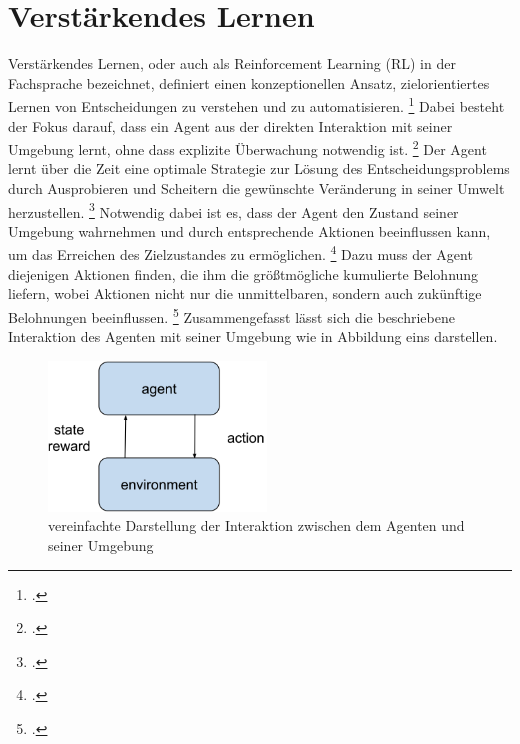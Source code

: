 \section{Verstärkendes Lernen}
Verstärkendes Lernen, oder auch als Reinforcement Learning (RL) in der Fachsprache bezeichnet, definiert einen konzeptionellen Ansatz, zielorientiertes Lernen von Entscheidungen zu verstehen und zu automatisieren. \footcite[Vgl.][S. 13]{Sutton.2018}
Dabei besteht der Fokus darauf, dass ein Agent aus der direkten Interaktion mit seiner Umgebung lernt, ohne dass explizite Überwachung notwendig ist. \footcite[Vgl.][S. 13]{Sutton.2018}
Der Agent lernt über die Zeit eine optimale Strategie zur Lösung des Entscheidungsproblems durch Ausprobieren und Scheitern die gewünschte Veränderung in seiner Umwelt herzustellen. \footcite[Vgl.][S. 4]{Li.2019}
Notwendig dabei ist es, dass der Agent den Zustand seiner Umgebung wahrnehmen und durch entsprechende Aktionen beeinflussen kann, um das Erreichen des Zielzustandes zu ermöglichen. \footcite[Vgl.][S. 2]{Sutton.2018}
Dazu muss der Agent diejenigen Aktionen finden, die ihm die größtmögliche kumulierte Belohnung liefern, wobei Aktionen nicht nur die unmittelbaren, sondern auch zukünftige Belohnungen beeinflussen. \footcite[Vgl.][S. 1]{Sutton.2018}
Zusammengefasst lässt sich die beschriebene Interaktion des Agenten mit seiner Umgebung wie in Abbildung eins darstellen.
\begin{figure}[htb]
    \centering
    \includegraphics[height=4cm]{lib/graphics/Agent-Environment interaction.png}
    \caption[vereinfachte Darstellung der Interaktion zwischen dem Agenten und seiner Umgebung]{vereinfachte Darstellung der Interaktion zwischen dem Agenten und seiner Umgebung\footnotemark}
    \label{abb:Agent-Environment interaction}
\end{figure}

